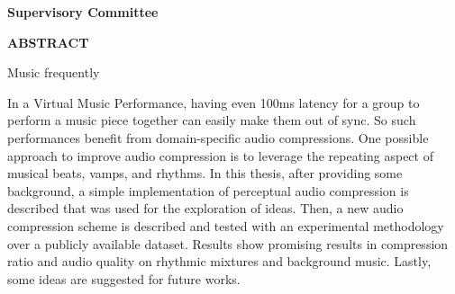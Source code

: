 \newpage
{}

\noindent\textbf{Supervisory Committee}
\tpbreak
\panel

\begin{center}
\textbf{ABSTRACT}
\end{center}


Music frequently 

In a Virtual Music Performance, having even 100ms latency for a group to perform a music piece together can easily make them out of sync. So such performances benefit from domain-specific audio compressions. One possible approach to improve audio compression is to leverage the repeating aspect of musical beats, vamps, and rhythms. In this thesis, after providing some background, a simple implementation of perceptual audio compression is described that was used for the exploration of ideas. Then, a new audio compression scheme is described and tested with an experimental methodology over a publicly available dataset. Results show promising results in compression ratio and audio quality on rhythmic mixtures and background music. Lastly, some ideas are suggested for future works.
